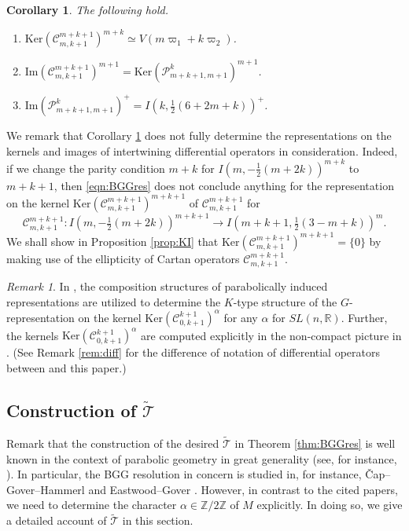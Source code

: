 \documentclass[reqno,11pt]{amsart}
\newtheorem{cor}[equation]{Corollary}
\theoremstyle{remark}
\newtheorem{rem}[equation]{Remark}
\numberwithin{equation}{section}
\newcommand{\ga}{\alpha}
\newcommand{\R}{\mathbb{R}}
\newcommand{\Z}{\mathbb{Z}}
\newcommand{\Cal}{\mathcal}
\renewcommand{\Im}{\mathrm{Im}}
\newcommand{\To}{\longrightarrow}
\newcommand{\wT}{\widetilde{\Cal{T}}}
\newcommand{\Ker}{\mathrm{Ker}}
\begin{document}
\begin{cor}\label{cor:BGGres}
The following hold.
\begin{enumerate}

\item[\emph{(1)}] $\Ker(\Cal{C}^{m+k+1}_{m,k+1})^{m+k}\simeq V(m\varpi_1+k\varpi_2)$.
\vskip 0.1in

\item[\emph{(2)}] $\Im(\Cal{C}^{m+k+1}_{m,k+1})^{m+1} 
= \Ker(\Cal{P}^{k}_{m+k+1,m+1})^{m+1}$.

\vskip 0.1in

\item[\emph{(3)}] $\Im(\Cal{P}^{k}_{m+k+1,m+1})^{+} = I(k, \tfrac{1}{2}(6+2m+k))^{+}$.

\end{enumerate}
\end{cor}


We remark that Corollary \ref{cor:BGGres} does not fully determine
the representations on the kernels and images of 
 intertwining differential operators in consideration.
 Indeed, if we change the parity condition $m+k$
 for $I(m, -\tfrac{1}{2}(m+2k))^{m+k}$ to 
 $m+k+1$, then \eqref{eqn:BGGres} 
 does not conclude anything for the representation on 
 the kernel  $\Ker(\Cal{C}^{m+k+1}_{m,k+1})^{m+k+1}$ of 
$ \Cal{C}^{m+k+1}_{m,k+1}$ for
 \begin{equation*}
\Cal{C}^{m+k+1}_{m,k+1} \colon
I(m, -\tfrac{1}{2}(m+2k))^{m+k+1}
\To
I(m+k+1, \tfrac{1}{2}(3-m+k))^{m}.
\end{equation*}
We shall show in Proposition \ref{prop:KI} that 
$\Ker(\Cal{C}^{m+k+1}_{m,k+1})^{m+k+1}=\{0\}$
by making use of the ellipticity of Cartan operators $\Cal{C}^{m+k+1}_{m,k+1}$.
 
\begin{rem}\label{rem:Ktype}
In \cite{KuOr25a},
the composition structures of parabolically induced representations
are utilized to determine the $K$-type structure of 
the $G$-representation on the kernel $\Ker(\Cal{C}^{k+1}_{0,k+1})^{\ga}$  for any $\ga$
for $SL(n,\R)$. Further, 
the kernels $\Ker(\Cal{C}^{k+1}_{0,k+1})^{\ga}$ are 
computed explicitly in the non-compact picture in \cite{Kubo24+}.
(See Remark \ref{rem:diff} for the difference of notation of differential operators
between \cite{Kubo24+, KuOr25a} and this paper.)
\end{rem}


\subsection{Construction of $\wT$}
\label{sec:const}
Remark that the construction of the desired $\wT$ in Theorem \ref{thm:BGGres}
is well known in the context of 
parabolic geometry in great generality (see, for instance, \cite{CD01, CSS01}). 
In particular, the BGG resolution in concern is studied in, for instance,
{\v C}ap--Gover--Hammerl \cite{CGH12b} and 
Eastwood--Gover \cite{EG11}.
However, in contrast to the cited papers, we need to determine the character
$\ga \in \Z/2\Z$ of $M$ explicitly. In doing so, we give a detailed account of $\wT$ 
in this section.
\end{document}
